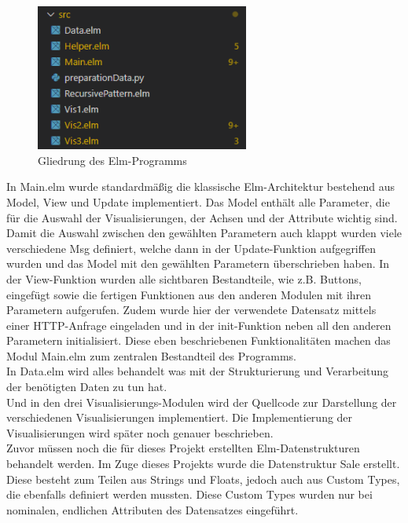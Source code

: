 \documentclass[usegeometry=true]{scrartcl}
\begin{document}
\begin{figure} [H]
	\begin{center}
		\includegraphics[width=7cm]{IMG/Modulgliederung}
		\caption{Gliedrung des Elm-Programms}
		\label{fig:Modulgliederung}
	\end{center}
\end{figure}

\noindent In Main.elm wurde standardmäßig die klassische Elm-Architektur bestehend aus Model, View und Update implementiert. Das Model enthält alle Parameter, die für die Auswahl der
Visualisierungen, der Achsen und der Attribute wichtig sind. Damit die Auswahl zwischen den gewählten Parametern auch klappt wurden viele verschiedene Msg definiert, welche dann
in der Update-Funktion aufgegriffen wurden und das Model mit den gewählten Parametern überschrieben haben. In der View-Funktion wurden alle sichtbaren Bestandteile, wie z.B.
Buttons, eingefügt sowie die fertigen Funktionen aus den anderen Modulen mit ihren Parametern aufgerufen. Zudem wurde hier der verwendete Datensatz mittels einer HTTP-Anfrage
eingeladen und in der init-Funktion neben all den anderen Parametern initialisiert. Diese eben beschriebenen Funktionalitäten machen das Modul Main.elm zum zentralen
Bestandteil des Programms.\\
In Data.elm wird alles behandelt was mit der Strukturierung und Verarbeitung der benötigten Daten zu tun hat.\\ Und in den drei Visualisierungs-Modulen
wird der Quellcode zur Darstellung der verschiedenen Visualisierungen implementiert. Die Implementierung der Visualisierungen wird später noch genauer beschrieben.\\
Zuvor müssen noch die für dieses Projekt erstellten Elm-Datenstrukturen behandelt werden. Im Zuge dieses Projekts wurde die Datenstruktur Sale erstellt. Diese besteht zum Teilen
aus Strings und Floats, jedoch auch aus Custom Types, die ebenfalls definiert werden mussten. Diese Custom Types wurden nur bei nominalen, endlichen Attributen des Datensatzes
eingeführt.
\end{document}
